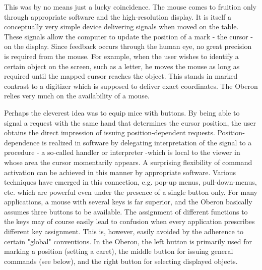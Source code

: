 This was by no means just a lucky coincidence. The mouse comes to fruition only through
appropriate software and the high-resolution display. It is itself a conceptually very simple device
delivering signals when moved on the table. These signals allow the computer to update the
position of a mark - the cursor - on the display. Since feedback occurs through the human eye, no
great precision is required from the mouse. For example, when the user wishes to identify a certain
object on the screen, such as a letter, he moves the mouse as long as required until the mapped
cursor reaches the object. This stands in marked contrast to a digitizer which is supposed to deliver
exact coordinates. The Oberon relies very much on the availability of a mouse.

Perhaps the cleverest idea was to equip mice with buttons. By being able to signal a request with
the same hand that determines the cursor position, the user obtains the direct impression of issuing
position-dependent requests. Position-dependence is realized in software by delegating
interpretation of the signal to a procedure - a so-called handler or interpreter -which is local to the
viewer in whose area the cursor momentarily appears. A surprising flexibility of command activation
can be achieved in this manner by appropriate software. Various techniques have emerged in this
connection, e.g. pop-up menus, pull-down-menus, etc. which are powerful even under the presence
of a single button only. For many applications, a mouse with several keys is far superior, and the
Oberon basically assumes three buttons to be available. The assignment of different
functions to the keys may of course easily lead to confusion when every application prescribes
different key assignment. This is, however, easily avoided by the adherence to certain "global"
conventions. In the Oberon, the left button is primarily used for marking a position (setting a
caret), the middle button for issuing general commands (see below), and the right button for
selecting displayed objects.

